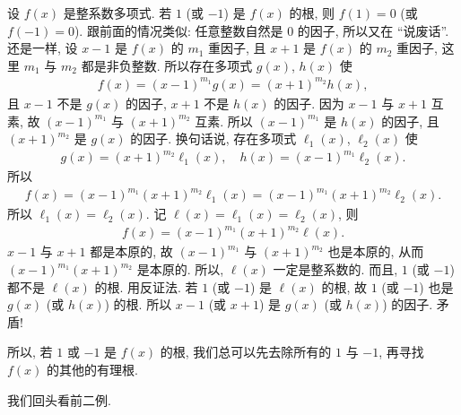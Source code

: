 \begin{remark}
    设 $f(x)$ 是整系数多项式. 若 $1$ (或 $-1$) 是 $f(x)$ 的根, 则 $f(1) = 0$ (或 $f(-1) = 0$). 跟前面的情况类似: 任意整数自然是 $0$ 的因子, 所以又在 ``说废话''. 还是一样, 设 $x - 1$ 是 $f(x)$ 的 $m_1$ 重因子, 且 $x + 1$ 是 $f(x)$ 的 $m_2$ 重因子, 这里 $m_1$ 与 $m_2$ 都是非负整数. 所以存在多项式 $g(x)$, $h(x)$ 使
    \begin{align*}
        f(x) = (x - 1)^{m_1} g(x) = (x + 1)^{m_2} h(x),
    \end{align*}
    且 $x-1$ 不是 $g(x)$ 的因子, $x+1$ 不是 $h(x)$ 的因子. 因为 $x-1$ 与 $x+1$ 互素, 故 $(x-1)^{m_1}$ 与 $(x+1)^{m_2}$ 互素. 所以 $(x-1)^{m_1}$ 是 $h(x)$ 的因子, 且 $(x+1)^{m_2}$ 是 $g(x)$ 的因子. 换句话说, 存在多项式 $\ell_1 (x)$, $\ell_2 (x)$ 使
    \begin{align*}
        g(x) = (x+1)^{m_2} \ell_1 (x), \quad h(x) = (x-1)^{m_1} \ell_2 (x).
    \end{align*}
    所以
    \begin{align*}
        f(x) = (x-1)^{m_1} (x+1)^{m_2} \ell_1 (x) = (x-1)^{m_1} (x+1)^{m_2} \ell_2 (x).
    \end{align*}
    所以 $\ell_1 (x) = \ell_2 (x)$. 记 $\ell (x) = \ell_1 (x) = \ell_2 (x)$, 则
    \begin{align*}
        f(x) = (x-1)^{m_1} (x+1)^{m_2} \ell (x).
    \end{align*}
    $x-1$ 与 $x+1$ 都是本原的, 故 $(x-1)^{m_1}$ 与 $(x+1)^{m_2}$ 也是本原的, 从而 $(x-1)^{m_1} (x+1)^{m_2}$ 是本原的. 所以, $\ell (x)$ 一定是整系数的. 而且, $1$ (或 $-1$) 都不是 $\ell (x)$ 的根. 用反证法. 若 $1$ (或 $-1$) 是 $\ell (x)$ 的根, 故 $1$ (或 $-1$) 也是 $g(x)$ (或 $h(x)$) 的根. 所以 $x-1$ (或 $x+1$) 是 $g(x)$ (或 $h(x)$) 的因子. 矛盾!

    所以, 若 $1$ 或 $-1$ 是 $f(x)$ 的根, 我们总可以先去除所有的 $1$ 与 $-1$, 再寻找 $f(x)$ 的其他的有理根.
\end{remark}

我们回头看前二例.


